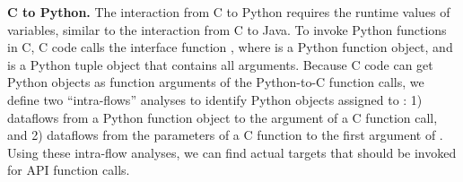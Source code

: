 
\medskip

\textbf{C to Python.} The interaction from C to Python requires the runtime
values of variables, similar to the interaction from C to Java. 
To invoke Python functions in C, C code calls the interface function
, where  is a Python
function object, and  is a Python tuple object that contains
all arguments. 
Because C code can get Python objects as
function arguments of the Python-to-C function calls,
we define two
``intra-flows'' analyses to identify Python objects assigned to :
1) dataflows from a Python function object to the argument of a C function call,
and 2) dataflows from the parameters of a C function to the first argument of .
Using these intra-flow analyses, we can find actual targets that should be invoked
for  API function calls.


